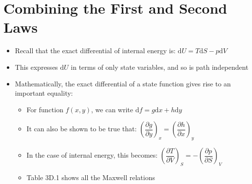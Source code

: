 \documentclass[12pt, openany, letterpaper]{memoir}
\begin{document}
\section{Combining the First and Second Laws}
\begin{itemize}
	\item Recall that the exact differential of internal energy is: $\mathrm{d}U = T\mathrm{d}S - p\mathrm{d}V$
	\item This expresses $\mathrm{d}U$ in terms of only state variables, and so is path independent
	\item Mathematically, the exact differential of a state function gives rise to an important equality:
	\begin{itemize}
		\item For function $f(x,y)$, we can write $\mathrm{d}f = g\mathrm{d}x + h\mathrm{d}y$
		\item It can also be shown to be true that: $\left(\dfrac{\partial g}{\partial y}\right)_x = \left(\dfrac{\partial h}{\partial x}\right)_y$
		\item In the case of internal energy, this becomes: $\left(\dfrac{\partial T}{\partial V}\right)_S = -\left(\dfrac{\partial p}{\partial S}\right)_V$
		\item Table 3D.1 shows all the Maxwell relations
	\end{itemize}	
\end{itemize}
\end{document}
